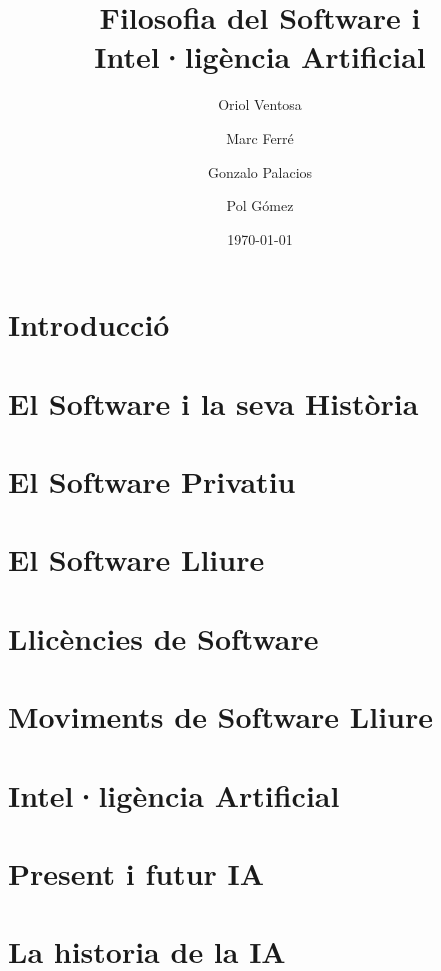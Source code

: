 \documentclass[a4paper,12pt]{report}
\begin{document}


\title{
	{\bf Filosofia del Software i Intel·ligència Artificial}
}
\author{
	Oriol Ventosa \and
	Marc Ferré \and
	Gonzalo Palacios \and
	Pol Gómez
}
\date{\today}
\maketitle

\tableofcontents

\chapter{Introducció}


\chapter{El Software i la seva Història}


\chapter{El Software Privatiu}


\chapter{El Software Lliure}


\chapter{Llicències de Software}


\chapter{Moviments de Software Lliure}


\chapter{Intel·ligència Artificial}


\chapter{Present i futur IA}


\chapter{La historia de la IA}




\end{document}
